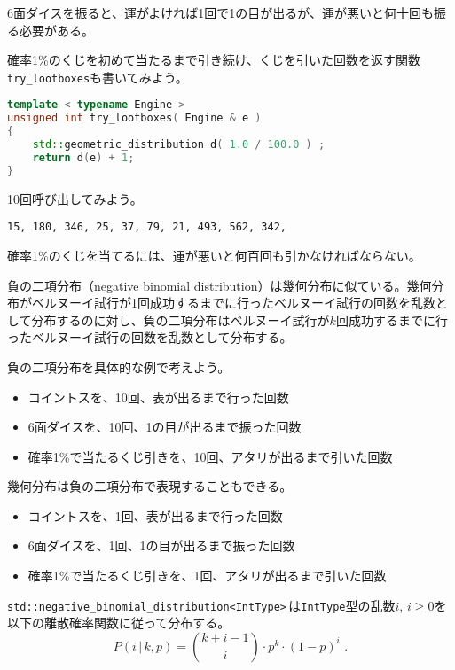 6面ダイスを振ると、運がよければ1回で1の目が出るが、運が悪いと何十回も振る必要がある。

確率1\%のくじを初めて当たるまで引き続け、くじを引いた回数を返す関数\texttt{try\_lootboxes}も書いてみよう。

\begin{lstlisting}[language={C++}]
template < typename Engine >
unsigned int try_lootboxes( Engine & e )
{
    std::geometric_distribution d( 1.0 / 100.0 ) ;
    return d(e) + 1;
}
\end{lstlisting}

10回呼び出してみよう。

\begin{lstlisting}[style=terminal]
15, 180, 346, 25, 37, 79, 21, 493, 562, 342,
\end{lstlisting}

確率1\%のくじを当てるには、運が悪いと何百回も引かなければならない。


負の二項分布（negative binomial distribution）は幾何分布に似ている。幾何分布がベルヌーイ試行が1回成功するまでに行ったベルヌーイ試行の回数を乱数として分布するのに対し、負の二項分布はベルヌーイ試行が\(k\)回成功するまでに行ったベルヌーイ試行の回数を乱数として分布する。

負の二項分布を具体的な例で考えよう。

\begin{itemize}
\item
  コイントスを、10回、表が出るまで行った回数
\item
  6面ダイスを、10回、1の目が出るまで振った回数
\item
  確率1\%で当たるくじ引きを、10回、アタリが出るまで引いた回数
\end{itemize}

幾何分布は負の二項分布で表現することもできる。

\begin{itemize}
\item
  コイントスを、1回、表が出るまで行った回数
\item
  6面ダイスを、1回、1の目が出るまで振った回数
\item
  確率1\%で当たるくじ引きを、1回、アタリが出るまで引いた回数
\end{itemize}

\texttt{std::negative\_binomial\_distribution<IntType>}\,は\texttt{IntType}型の乱数\(i\), \(i \geq 0\)を以下の離散確率関数に従って分布する。
\[
P(i\,|\,k,p) = \binom{k+i-1}{i} \cdot p^k \cdot (1-p)^i \text{ .} 
\]

